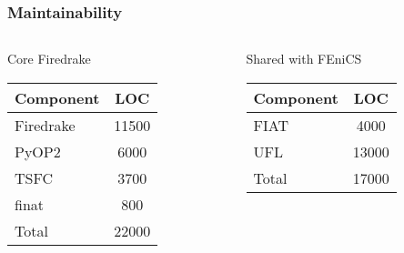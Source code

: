 \documentclass[presentation]{beamer}
\begin{document}
\begin{frame}
  \frametitle{Maintainability}
  \begin{columns}
    \begin{column}[t]{0.5\textwidth}
      \begin{block}{Core Firedrake}
        \begin{table}
          \centering
          \begin{tabular}{lc}
            Component & LOC   \\
            \hline
            Firedrake & 11500 \\
            PyOP2     & 6000  \\
            TSFC      & 3700  \\
            finat     & 800   \\
            \hline
            Total     & 22000
          \end{tabular}
        \end{table}
      \end{block}
    \end{column}
    \begin{column}[t]{0.5\textwidth}
      \begin{block}{Shared with FEniCS}
        \begin{table}
          \centering
          \begin{tabular}{lc}
            Component & LOC   \\
            \hline
            FIAT      & 4000  \\
            UFL       & 13000 \\
            \hline
            Total     & 17000
          \end{tabular}
        \end{table}        
      \end{block}
    \end{column}
  \end{columns}
\end{frame}
\end{document}
